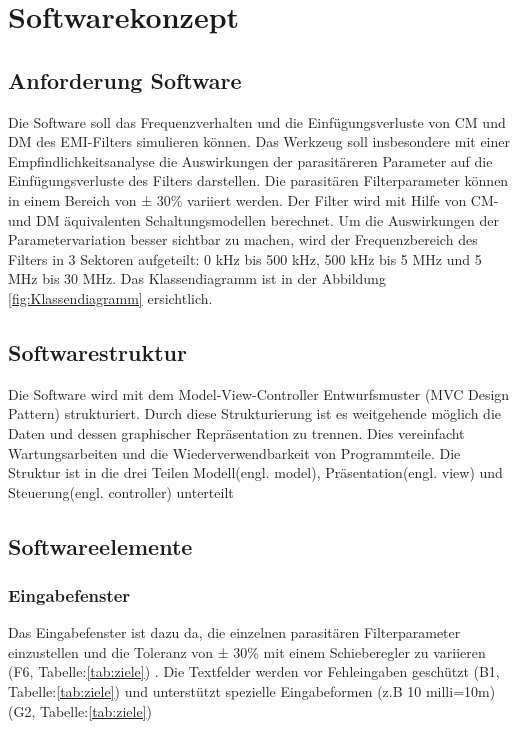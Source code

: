 \section{Softwarekonzept} \label{sec:softwarekonzept}

\subsection{Anforderung Software} \label{subsec:anforderungSoftware}

Die Software soll das Frequenzverhalten und die Einfügungsverluste von CM und DM des EMI-Filters simulieren können. Das Werkzeug soll insbesondere mit einer Empfindlichkeitsanalyse die Auswirkungen der parasitäreren Parameter auf die Einfügungsverluste des Filters darstellen. Die parasitären Filterparameter können in einem Bereich von ± 30\% variiert werden. Der Filter wird mit Hilfe von CM- und DM äquivalenten Schaltungsmodellen berechnet. Um die Auswirkungen der Parametervariation besser sichtbar zu machen, wird der Frequenzbereich des Filters in 3 Sektoren aufgeteilt: 0 kHz bis 500 kHz, 500 kHz bis 5 MHz und 5 MHz bis 30 MHz. Das Klassendiagramm ist in der Abbildung \ref{fig:Klassendiagramm} ersichtlich.

\subsection{Softwarestruktur} \label{subsec:softwarestruktur}

Die Software wird mit dem Model-View-Controller Entwurfsmuster (MVC Design Pattern) \cite{MVCDesignPattern} strukturiert. Durch diese Strukturierung ist es weitgehende möglich die Daten und dessen graphischer Repräsentation zu trennen. Dies vereinfacht Wartungsarbeiten und die Wiederverwendbarkeit von Programmteile. Die Struktur ist in die drei Teilen Modell(engl. model), Präsentation(engl. view) und Steuerung(engl. controller) unterteilt

\subsection{Softwareelemente} \label{subsec:softwareelemente}

\subsubsection{Eingabefenster} \label{subsubsec:eingabefenster}

Das Eingabefenster ist dazu da, die einzelnen parasitären Filterparameter einzustellen und die Toleranz von ± 30\% mit einem Schieberegler zu variieren (F6, Tabelle:\ref{tab:ziele}) . Die  Textfelder werden vor Fehleingaben geschützt (B1, Tabelle:\ref{tab:ziele}) und unterstützt spezielle Eingabeformen (z.B 10 milli=10m) (G2, Tabelle:\ref{tab:ziele})


